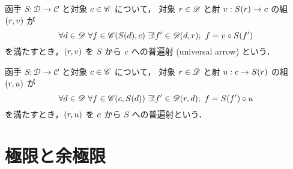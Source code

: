 \documentclass[titlepage]{ltjsreport}
\newcommand{\cat}[1]{\mathscr{#1}}
\newcommand{\obj}[1]{\lowercase{#1}}
\newcommand{\objs}[1]{#1}
\newcommand{\mrp}[3]{{#1}:{#2}\to{#3}}
\newcommand{\mrps}[3]{#1(#2,#3)}
\begin{document}
 {
  \def\C{\cat{C}}%
  \def\D{\cat{D}}%
  \def\c{\obj{c}}%
  \def\d{\obj{d}}%
  \def\r{\obj{r}}%
  \def\S{S}%
  \def\f{f}%
  \def\g{f'}%
  \def\unia{v}%
  \def\unib{u}%

  \begin{definition}[普遍射-1]
    函手 $\mrp{S}{\D}{\C}$ と対象 $\c\in\objs{\C}$ について，
    対象 $\r\in\objs{\D}$ と射 $\mrp{\unia}{\S(\r)}{\c}$ の組 $(\r,\unia)$ が
    \begin{equation}
      \forall\d\in\objs{\D}\ \forall\f\in\mrps{\C}{\S(\d)}{\c}
      \ \exists!\g\in\mrps{\D}{\d}{\r};\ \f=\unia\circ\S(\g)
    \end{equation}
    を満たすとき，$(\r,\unia)$ を $\S$ から $\c$ への普遍射 (universal arrow) という．
    \begin{center}
    \end{center}
  \end{definition}

  \begin{definition}[普遍射-2]
    函手 $\mrp{\S}{\D}{\C}$ と対象 $\c\in\objs{\C}$ について，
    対象 $\r\in\objs{\D}$ と射 $\mrp{\unib}{\c}{\S(\r)}$ の組 $(\r,\unib)$ が
    \begin{equation}
      \forall\d\in\objs{\D}\ \forall\f\in\mrps{\C}{\c}{\S(\d)}
      \ \exists!\g\in\mrps{\D}{\r}{\d};\ \f=\S(\g)\circ\unib
    \end{equation}
    を満たすとき，$(\r,u)$ を $\c$ から $S$ への普遍射という．
    \begin{center}
    \end{center}
  \end{definition}
 }

\section{極限と余極限}
\end{document}
